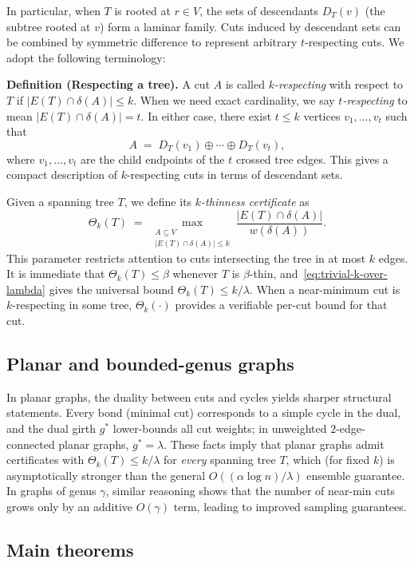 \documentclass[11pt,letterpaper]{article}
\begin{document}
In particular, when $T$ is rooted at $r\in V$, the sets of descendants
$D_T(v)$ (the subtree rooted at $v$) form a laminar family.
Cuts induced by descendant sets can be combined by symmetric difference
to represent arbitrary $t$-respecting cuts.
We adopt the following terminology:

\medskip
\noindent
\textbf{Definition (Respecting a tree).}
A cut $A$ is called \emph{$k$-respecting} with respect to $T$
if $|E(T)\cap\delta(A)|\le k$. When we need exact cardinality, we
say \emph{$t$-respecting} to mean $|E(T)\cap\delta(A)|=t$.
In either case, there exist $t\le k$ vertices $v_1,\dots,v_t$ such that
\[
A \;=\; D_T(v_1)\oplus \cdots \oplus D_T(v_t),
\]
where $v_1,\dots,v_t$ are the child endpoints of the $t$ crossed tree edges.
This gives a compact description of $k$-respecting cuts in terms
of descendant sets.

Given a spanning tree $T$, we define its \emph{$k$-thinness certificate} as
\[
\Theta_k(T) \;=\;
\max_{\substack{A\subseteq V\\ |E(T)\cap\delta(A)|\le k}}
\frac{|E(T)\cap\delta(A)|}{w(\delta(A))}.
\]
This parameter restricts attention to cuts intersecting the tree in at most $k$ edges.
It is immediate that $\Theta_k(T)\le \beta$ whenever $T$ is $\beta$-thin,
and~\eqref{eq:trivial-k-over-lambda} gives the universal bound $\Theta_k(T)\le k/\lambda$.
When a near-minimum cut is $k$-respecting in some tree, $\Theta_k(\cdot)$
provides a verifiable per-cut bound for that cut.

\subsection{Planar and bounded-genus graphs}
\label{sec:planar-prelim}

In planar graphs, the duality between cuts and cycles yields
sharper structural statements. Every bond (minimal cut) corresponds
to a simple cycle in the dual, and the dual girth $g^\ast$ lower-bounds
all cut weights; in unweighted $2$-edge-connected planar graphs, $g^\ast=\lambda$.
These facts imply that planar graphs admit
certificates with $\Theta_k(T)\le k/\lambda$ for \emph{every} spanning tree $T$,
which (for fixed $k$) is asymptotically stronger than the general $O((\alpha\log n)/\lambda)$
ensemble guarantee. In graphs of genus $\gamma$, similar reasoning shows that the
number of near-min cuts grows only by an additive $O(\gamma)$ term,
leading to improved sampling guarantees.

\subsection{Main theorems}
\end{document}

